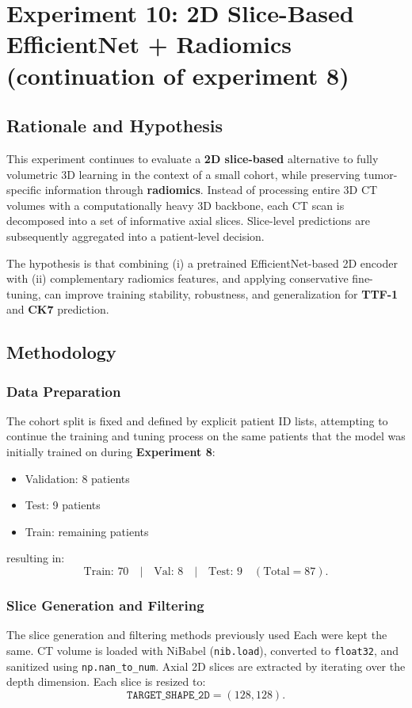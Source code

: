 \section{Experiment 10: 2D Slice-Based EfficientNet + Radiomics (continuation of experiment 8)}

\subsection{Rationale and Hypothesis}
This experiment continues to evaluate a \textbf{2D slice-based} alternative to fully volumetric 3D learning in the context of a small cohort, while preserving tumor-specific information through \textbf{radiomics}. Instead of processing entire 3D CT volumes with a computationally heavy 3D backbone, each CT scan is decomposed into a set of informative axial slices. Slice-level predictions are subsequently aggregated into a patient-level decision.

The hypothesis is that combining (i) a pretrained EfficientNet-based 2D encoder with (ii) complementary radiomics features, and applying conservative fine-tuning, can improve training stability, robustness, and generalization for \textbf{TTF-1} and \textbf{CK7} prediction.

\subsection{Methodology}

\subsubsection{Data Preparation}

The cohort split is fixed and defined by explicit patient ID lists, attempting to continue the training and tuning process on the same patients that the model was initially trained on during \textbf{Experiment 8}:
\begin{itemize}
    \item Validation: 8 patients
    \item Test: 9 patients
    \item Train: remaining patients
\end{itemize}
resulting in:
\[
\text{Train: }70 \quad | \quad \text{Val: }8 \quad | \quad \text{Test: }9 \quad (\text{Total}=87).
\]

\subsubsection{Slice Generation and Filtering}
The slice generation and filtering methods previously used Each were kept the same. CT volume is loaded with NiBabel (\texttt{nib.load}), converted to \texttt{float32}, and sanitized using \texttt{np.nan\_to\_num}. Axial 2D slices are extracted by iterating over the depth dimension. Each slice is resized to:
\[
\texttt{TARGET\_SHAPE\_2D} = (128, 128).
\]

